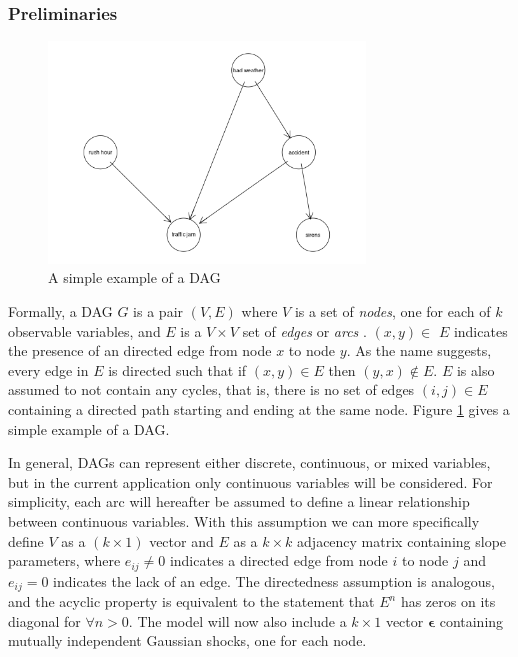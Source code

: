 \documentclass{article}
\begin{document}
\subsubsection{Preliminaries} \label{prelim}

\begin{figure}
  \centering
  \includegraphics[width=0.75\textwidth]{images/trafficjam.png}
  \caption{A simple example of a DAG \parencite{traffic_jam}}
  \label{dag1}
\end{figure}

Formally, a DAG $G$ is a pair $(V,E)$ where $V$ is a set of \textit{nodes}, one for each of $k$ observable variables, and $E$ is a $V \times V$ set of \textit{edges} or \textit{arcs} \parencite{kalisch2007estimating}. $(x,y) \in$ $E$ indicates the presence of an directed edge from node $x$ to node $y$. As the name suggests, every edge in $E$ is directed such that if $(x,y) \in E$ then $(y,x) \not \in E$. $E$ is also assumed to not contain any cycles, that is, there is no set of edges ${(i,j)} \in E$ containing a directed path starting and ending at the same node. Figure \ref{dag1} gives a simple example of a DAG.

In general, DAGs can represent either discrete, continuous, or mixed variables, but in the current application only continuous variables will be considered. For simplicity, each arc will hereafter be assumed to define a linear relationship between continuous variables. With this assumption we can more specifically define $V$ as a $(k \times 1)$ vector and $E$ as a $k \times k$ adjacency matrix containing slope parameters, where $e_{ij} \not = 0$ indicates a directed edge from node $i$ to node $j$ and $e_{ij} = 0$ indicates the lack of an edge. The directedness assumption is analogous, and the acyclic property is equivalent to the statement that $E^n$ has zeros on its diagonal for $\forall n > 0$. The model will now also include a $k \times 1$ vector $\mathbf{\epsilon}$ containing mutually independent Gaussian shocks, one for each node.
\end{document}
